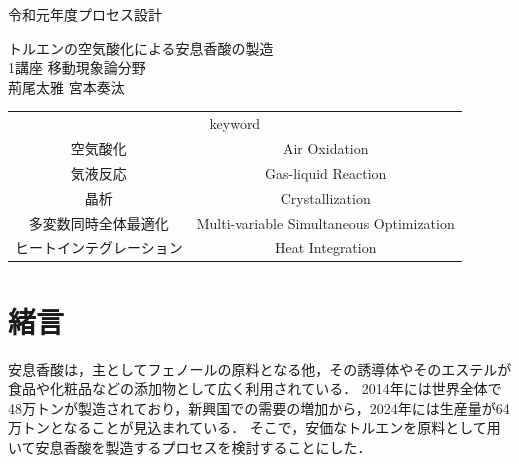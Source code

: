 \documentclass[a4j]{jsreport}
\begin{document}
\begin{titlepage}
\begin{flushleft}
{\Large 令和元年度プロセス設計} \\
\end{flushleft}
\vspace{5cm}
\centering
{\Huge トルエンの空気酸化による安息香酸の製造} \\
\vspace{2cm}
\centering
{\Large 1講座 移動現象論分野} \\
\vspace{0.5cm}
\centering
{\large 荊尾太雅  宮本奏汰} \\
\vspace{3cm}
\begin{table}[htbp]
    \begin{center}
        \begin{tabular}[htbp]{cc}
            \multicolumn{2}{c}{{\LARGE keyword}} \\
            {\Large 空気酸化}&{\Large Air Oxidation} \\
            {\Large 気液反応}&{\Large Gas-liquid Reaction} \\
            {\Large 晶析}&{\Large Crystallization} \\
            {\Large 多変数同時全体最適化}&{\Large Multi-variable Simultaneous Optimization} \\
            {\Large ヒートインテグレーション}&{\Large Heat Integration} \\
        \end{tabular}
    \end{center}
\end{table}
\end{titlepage}


\setcounter{tocdepth}{2}
\tableofcontents

\clearpage
{}

\chapter{緒言}
安息香酸は，主としてフェノールの原料となる他，その誘導体やそのエステルが食品や化粧品などの添加物として広く利用されている．
2014年には世界全体で48万トンが製造されており，新興国での需要の増加から，2024年には生産量が64万トンとなることが見込まれている\cite{hexa}．
そこで，安価なトルエンを原料として用いて安息香酸を製造するプロセスを検討することにした．


\clearpage
\end{document}
